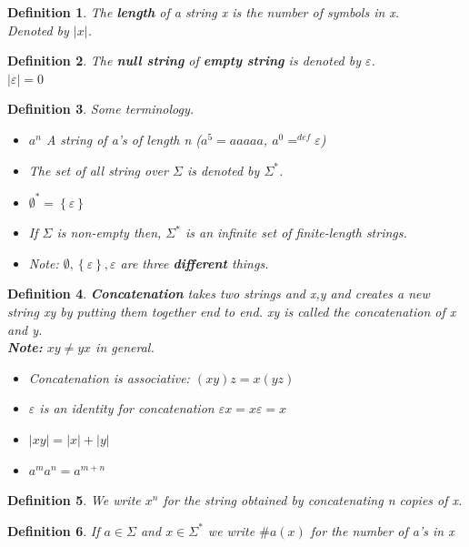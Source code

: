 \documentclass[a4paper]{article}
\newtheorem{definition}{Definition}
\begin{document}
\begin{definition}
    The \textbf{length} of a string x is the number of symbols in x.\\
    Denoted by $|x|$.
\end{definition}
\begin{definition}
    The \textbf{null string} of \textbf{empty string} is denoted by $\varepsilon$.\\
    $|\varepsilon|=0$
\end{definition}
\begin{definition}
    Some terminology.
    \begin{itemize}
        \item $a^n$ A string of a's of length n ($a^5=aaaaa$, $a^0=^{def}\varepsilon$)
        \item The set of all string over $\Sigma$ is denoted by $\Sigma^*$.
        \item $\emptyset^*=\left\{ \varepsilon \right\}$
        \item If $\Sigma$ is non-empty then, $\Sigma^*$ is an infinite set of
            finite-length strings.
        \item Note: $\emptyset,\left\{ \varepsilon \right\}, \varepsilon$ are three
            \textbf{different} things.
    \end{itemize}
\end{definition}
\begin{definition}
    \textbf{Concatenation} takes two strings and x,y and creates a new string xy
            by putting them together end to end. xy is called the concatenation of x and y.\\
            \textbf{Note:} $xy \neq yx$ in general.
            \begin{itemize}
                \item Concatenation is associative: $(xy)z=x(yz)$
                \item $\varepsilon$ is an identity for concatenation $\varepsilon x=x\varepsilon = x$
                \item $|xy|=|x|+|y|$
                \item $a^ma^n=a^{m+n}$
            \end{itemize}
\end{definition}
\begin{definition}
    We write $x^n$ for the string obtained by concatenating n copies of x.
\end{definition}
\begin{definition}
    If $a\in\Sigma$ and $x\in\Sigma^*$ we write $\#a(x)$ for the number
            of a's in x
\end{definition}
\end{document}

